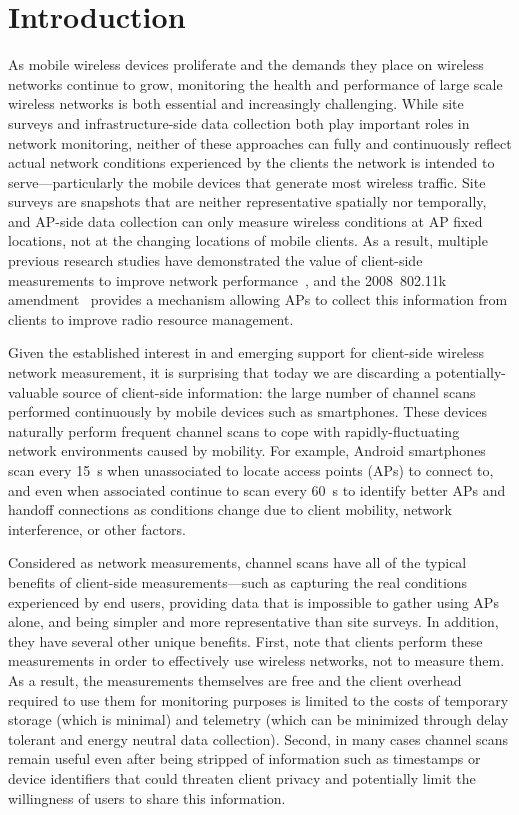 \section{Introduction}
\label{sec-introduction}

As mobile wireless devices proliferate and the demands they place on wireless
networks continue to grow, monitoring the health and performance of large
scale wireless networks is both essential and increasingly challenging. While
site surveys and infrastructure-side data collection both play important
roles in network monitoring, neither of these approaches can fully and
continuously reflect actual network conditions experienced by the clients the
network is intended to serve---particularly the mobile devices that generate
most wireless traffic. Site surveys are snapshots that are neither
representative spatially nor temporally, and AP-side data collection can only
measure wireless conditions at AP fixed locations, not at the changing
locations of mobile clients. As a result, multiple previous research studies
have demonstrated the value of client-side measurements to improve network
performance~\cite{mishra2005weighted,mishra2006client}, and the 2008~802.11k
amendment~\cite{80211k} provides a mechanism allowing APs to collect this
information from clients to improve radio resource management.

Given the established interest in and emerging support for client-side
wireless network measurement, it is surprising that today we are discarding a
potentially-valuable source of client-side information: the large number of
channel scans performed continuously by mobile devices such as smartphones.
These devices naturally perform frequent channel scans to cope with
rapidly-fluctuating network environments caused by mobility. For example,
Android smartphones scan every 15~s when unassociated to locate access points
(APs) to connect to, and even when associated continue to scan every 60~s to
identify better APs and handoff connections as conditions change due to
client mobility, network interference, or other factors.

Considered as network measurements, channel scans have all of the typical
benefits of client-side measurements---such as capturing the real conditions
experienced by end users, providing data that is impossible to gather using
APs alone, and being simpler and more representative than site surveys. In
addition, they have several other unique benefits. First, note that clients
perform these measurements in order to effectively use wireless networks, not
to measure them. As a result, the measurements themselves are free and the
client overhead required to use them for monitoring purposes is limited to
the costs of temporary storage (which is minimal) and telemetry (which can be
minimized through delay tolerant and energy neutral data collection). Second,
in many cases channel scans remain useful even after being stripped of
information such as timestamps or device identifiers that could threaten
client privacy and potentially limit the willingness of users to share this
information.


